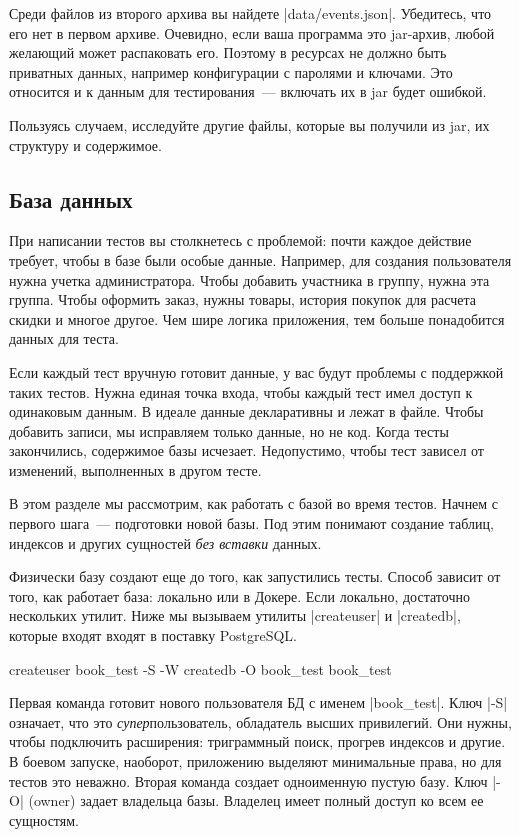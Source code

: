 Среди файлов из второго архива вы найдете \spverb|data/events.json|. Убедитесь,
что его нет в первом архиве. Очевидно, если ваша программа это jar-архив, любой
желающий может распаковать его. Поэтому в ресурсах не должно быть приватных
данных, например конфигурации с паролями и ключами. Это относится и к данным для
тестирования~--- включать их в jar будет ошибкой.

Пользуясь случаем, исследуйте другие файлы, которые вы получили из jar, их
структуру и содержимое.

\subsection{База данных}

При написании тестов вы столкнетесь с проблемой: почти каждое действие требует,
чтобы в базе были особые данные. Например, для создания пользователя нужна
учетка администратора. Чтобы добавить участника в группу, нужна эта
группа. Чтобы оформить заказ, нужны товары, история покупок для расчета скидки и
многое другое. Чем шире логика приложения, тем больше понадобится данных для
теста.

Если каждый тест вручную готовит данные, у вас будут проблемы с поддержкой таких
тестов. Нужна единая точка входа, чтобы каждый тест имел доступ к одинаковым
данным. В идеале данные декларативны и лежат в файле. Чтобы добавить записи, мы
исправляем только данные, но не код. Когда тесты закончились, содержимое базы
исчезает. Недопустимо, чтобы тест зависел от изменений, выполненных в другом
тесте.

В этом разделе мы рассмотрим, как работать с базой во время тестов. Начнем с
первого шага~--- подготовки новой базы. Под этим понимают создание таблиц,
индексов и других сущностей \emph{без вставки} данных.

Физически базу создают еще до того, как запустились тесты. Способ зависит от
того, как работает база: локально или в Докере. Если локально, достаточно
нескольких утилит. Ниже мы вызываем утилиты \spverb|createuser| и
\spverb|createdb|, которые входят входят в поставку PostgreSQL.

\begin{english}
  \begin{bash}
createuser book_test -S -W
createdb -O book_test book_test
  \end{bash}
\end{english}

Первая команда готовит нового пользователя БД с именем \spverb|book_test|. Ключ
\spverb|-S| означает, что это \emph{супер}пользователь, обладатель высших
привилегий. Они нужны, чтобы подключить расширения: триграммный поиск, прогрев
индексов и другие. В боевом запуске, наоборот, приложению выделяют минимальные
права, но для тестов это неважно. Вторая команда создает одноименную пустую
базу. Ключ \spverb|-O| (owner) задает владельца базы. Владелец имеет полный
доступ ко всем ее сущностям.

